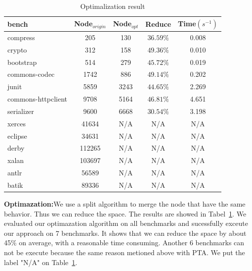 \documentclass{llncs}
\begin{document}
\begin{table}[!htbp]\centering
\caption{Optimalization result}
\begin{tabular}{lcccc}
	\hline
	\textbf{bench} & \textbf{Node$_{origin}$} & \textbf{Node$_{opt}$} & \textbf{Reduce} & \textbf{Time$(s^{-1})$} \\
	\hline
	compress & 205 & 130 & $36.59\%$ & 0.008 \\
	crypto & 312 & 158 & $49.36\%$ & 0.010 \\
	bootstrap & 514 & 279 & $45.72\%$ & 0.019 \\
	commons-codec & 1742 & 886 & $49.14\%$ & 0.202 \\
	junit & 5859 & 3243 & $44.65\%$ & 2.269 \\
	commons-httpclient & 9708 & 5164 & $46.81\%$ & 4.651 \\
	serializer & 9600 & 6668 & $30.54\%$ & 3.198 \\
	xerces & 41634 & N/A & N/A & N/A\\
	eclipse & 34631 & N/A & N/A & N/A\\
	derby & 112265 & N/A & N/A & N/A\\
	xalan & 103697 & N/A & N/A & N/A\\
	antlr & 56589 & N/A & N/A & N/A\\
	batik & 89336 & N/A & N/A & N/A\\
	\hline
\end{tabular}
\label{experiment:Optimalization}
\end{table}

\textbf{Optimazation:}We use a split algorithm to merge the node that have the same behavior. Thus we can reduce the space. The results are showed in Tabel~\ref{experiment:Optimalization}. We evaluated our optimazation algorithm on all benchmarks and sucessfully exceute our approach on 7 benchmarks. It shows that we can reduce the space by about 45$\%$ on average, with a reasonable time consuming. Another 6 benchmarks can not be execute because the same reason metioned above with PTA. We put the label "N/A" on Table~\ref{experiment:Optimalization}.
\end{document}
